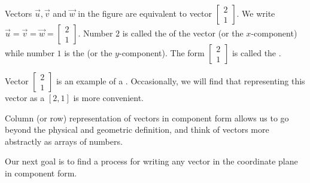 \documentclass{ximera}
\begin{document}
\begin{center}
\end{center}



Vectors $\vec{u}, \vec{v}$ and $\vec{w}$ in the figure are equivalent to vector $\begin{bmatrix}2\\1\end{bmatrix}$.  We write $\vec{u}=\vec{v}=\vec{w}=\begin{bmatrix}2\\1\end{bmatrix}$.  Number $2$ is called the  of the vector (or the $x$-component) while number $1$ is the  (or the $y$-component).  The form $\begin{bmatrix}2\\1\end{bmatrix}$ is called the .  

Vector $\begin{bmatrix}2\\1\end{bmatrix}$ is an example of a .  Occasionally, we will find that representing this vector as a  $[2, 1]$ is more convenient.

Column (or row) representation of vectors in component form allows us to go beyond the physical and geometric definition, and think of vectors more abstractly as arrays of numbers.

Our next goal is to find a process for writing any vector in the coordinate plane in component form.  
\end{document}
